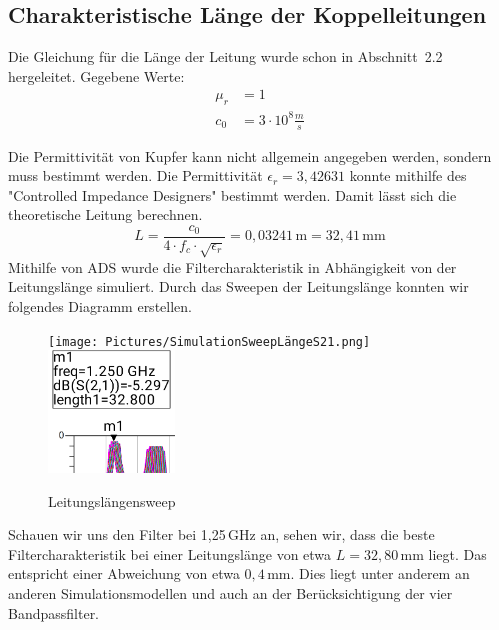 \subsection{Charakteristische Länge der Koppelleitungen}
Die Gleichung für die Länge der Leitung wurde schon in Abschnitt~2.2 hergeleitet.
Gegebene Werte:
\begin{align}
    \mu_r &= 1 \\
    c_0 &= 3 \cdot 10^8 \frac{m}{s}
\end{align}

Die Permittivität von Kupfer kann nicht allgemein angegeben werden, sondern muss bestimmt werden. 
Die Permittivität $\epsilon_r = 3{,}42631$ konnte mithilfe des "Controlled Impedance Designers" bestimmt werden. Damit lässt sich die theoretische Leitung berechnen.
\begin{equation}
    L = \frac{c_0}{4 \cdot f_c \cdot \sqrt{\epsilon_r}} = 0{,}03241\,\mathrm{m} = 32{,}41\,\mathrm{mm}
    \label{eq:laenge}
\end{equation}
\clearpage
Mithilfe von ADS wurde die Filtercharakteristik in Abhängigkeit von der Leitungslänge simuliert. Durch das Sweepen der 
Leitungslänge konnten wir folgendes Diagramm erstellen.
\begin{figure}[H]
    \texttt{[image: Pictures/SimulationSweepLängeS21.png]}
    \includegraphics[width=0.3\textwidth]{Pictures/gezoomt.png}
    \centering
    \caption{Leitungslängensweep}
\end{figure}
Schauen wir uns den Filter bei 1,25\,GHz an, sehen wir, dass die beste Filtercharakteristik bei einer
Leitungslänge von etwa $L=32{,}80\,\mathrm{mm}$ liegt.
Das entspricht einer Abweichung von etwa $0{,}4\,\mathrm{mm}$. Dies liegt unter anderem an anderen 
Simulationsmodellen und auch an der Berücksichtigung der vier Bandpassfilter.

\clearpage
